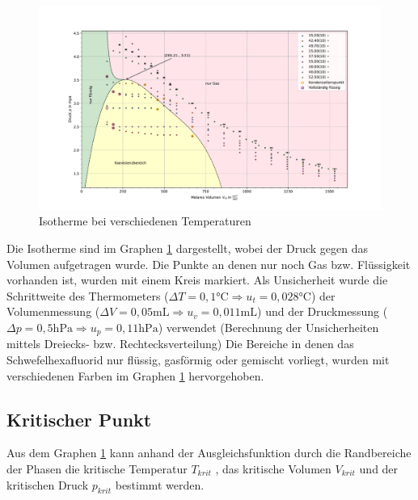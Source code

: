 \documentclass[11pt, a4paper]{article}
\begin{document}
    \begin{figure}
        \centering
        \includegraphics[width=\textwidth]{./Plots/4Plot_of_Hell.pdf}

        \caption{Isotherme bei verschiedenen Temperaturen}
        \label{fig:isotherme}
    \end{figure}
    Die Isotherme sind im Graphen \ref{fig:isotherme} dargestellt, wobei der Druck gegen das Volumen aufgetragen wurde.
    Die Punkte an denen nur noch Gas bzw. Flüssigkeit vorhanden ist, wurden mit einem Kreis markiert. Als
    Unsicherheit wurde die Schrittweite des Thermometers ($\Delta T = 0,1 \si{\celsius} \Rightarrow u_t = 0,028 \si{\celsius}$)
    der Volumenmessung ($\Delta V = 0,05 \si{\milli\liter} \Rightarrow u_v = 0,011 \si{\milli\liter}$) und der Druckmessung
    ($\Delta p = 0,5 \si{\hecto\pascal} \Rightarrow u_p = 0,11 \si{\hecto\pascal}$) verwendet (Berechnung der Unsicherheiten 	mittels Dreiecks- bzw. Rechtecksverteilung)
    Die Bereiche in denen das Schwefelhexafluorid nur flüssig, gasförmig oder gemischt vorliegt, wurden mit verschiedenen
    Farben im Graphen \ref{fig:isotherme} hervorgehoben.

    \subsection{Kritischer Punkt}

    Aus dem Graphen \ref{fig:isotherme} kann anhand der Ausgleichsfunktion durch die Randbereiche der Phasen
    die kritische Temperatur $T_{krit}$ , das kritische Volumen $V_{krit}$ und der kritischen Druck $p_{krit}$ bestimmt werden.
    
\end{document}
